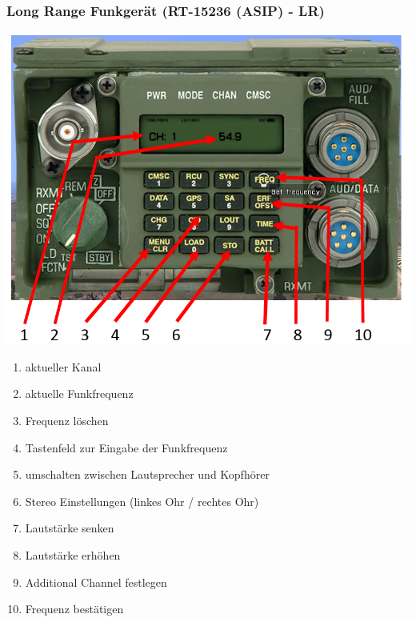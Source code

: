 \subsubsection{Long Range Funkgerät (RT-15236 (ASIP) - LR)}
\begin{minipage}[t]{1\textwidth}
	\includegraphics[width=\textwidth]{./Grafiken/Abschnitt/TFAR_LR_Radio.png}
\end{minipage}
\begin{enumerate}
	\item aktueller Kanal
	\item aktuelle Funkfrequenz
	\item Frequenz löschen
	\item Tastenfeld zur Eingabe der Funkfrequenz
	\item umschalten zwischen Lautsprecher und Kopfhörer
	\item Stereo Einstellungen (linkes Ohr / rechtes Ohr)
	\item Lautstärke  senken
	\item Lautstärke erhöhen
	\item Additional Channel festlegen
	\item Frequenz bestätigen
\end{enumerate}
